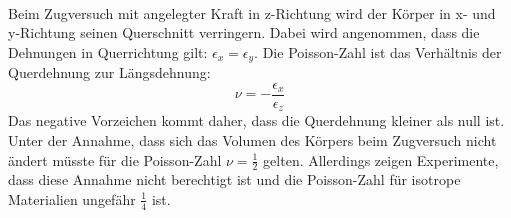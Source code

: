 \documentclass[11pt,a4paper]{article}
\numberwithin{equation}{section}
\numberwithin{figure}{section}
\begin{document}
\\
\begin{addmargin}[25pt]{0pt}
Beim Zugversuch mit angelegter Kraft in z-Richtung wird der Körper in x- und y-Richtung seinen Querschnitt verringern. Dabei wird angenommen, dass die Dehnungen in Querrichtung gilt: $\epsilon_x = \epsilon_y$. Die Poisson-Zahl ist das Verhältnis der Querdehnung zur Längsdehnung:
\begin{equation}\label{eq:Definition_Poisson_Zahl}
\nu = -\frac{\epsilon_x}{\epsilon_z}
\end{equation}
Das negative Vorzeichen kommt daher, dass die Querdehnung kleiner als null ist. Unter der Annahme, dass sich das Volumen des Körpers beim Zugversuch nicht ändert müsste für die Poisson-Zahl $\nu = \frac{1}{2}$ gelten. Allerdings zeigen Experimente, dass diese Annahme nicht berechtigt ist und die Poisson-Zahl für isotrope Materialien ungefähr $\frac{1}{4}$ ist.\\ 
\end{addmargin} 
\end{document}
